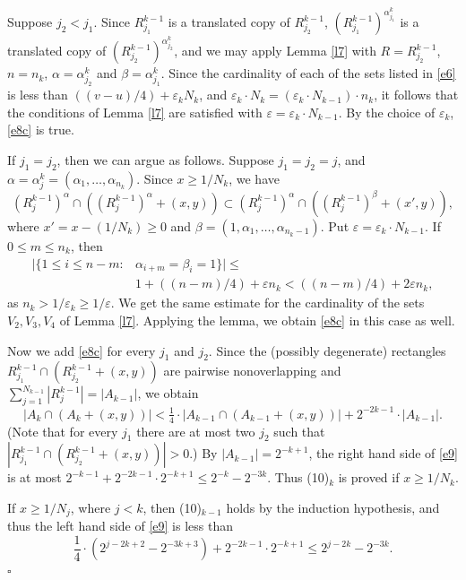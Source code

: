 \documentclass[12pt]{article}
\def\su{\subset}
\def\al{\alpha}
\def\be{\beta}
\def\ep{\varepsilon}
\def\cd{\cdot}
\def\stb{,\ldots ,}
\begin{document}
Suppose $j_2 < j_1$. Since $R_{j_1}^{k-1}$ is a translated copy of $R_{j_2}^{k-1}$,
$(R_{j_1}^{k-1} ) ^{\al^k_{j_1}}$ is a translated copy of $(R_{j_2}^{k-1} ) ^{\al^k_{j_2}}$,
and we may apply Lemma \ref{l7} with $R=R_{j_2}^{k-1}$, $n=n_k$, $\al =
\al^k_{j_2}$ and $\be = \al^k_{j_1}$. Since the cardinality of each of
the sets listed in \eqref{e6} is less than $((v-u)/4) +\ep_k N_k$, and
$\ep_k \cd N_k =(\ep _k\cd N_{k-1} ) \cd n_k$, it follows that the
conditions of Lemma \ref{l7} are satisfied with $\ep =\ep _k \cd N_{k-1}$.
By the choice of $\ep _k$, \eqref{e8c} is true.

If $j_1 =j_2$, then we can argue as follows. Suppose $j_1 =j_2 =j$, and
$\al =\al ^k_j =(\al _1 \stb \al _{n_k})$. Since $x\ge 1/N_k$, we have
$$ \left( R_j^{k-1}   \right) ^{\al} \cap \left( \left( R_j^{k-1}   \right) ^{\al}
+ (x,y) \right) \su \left( R_j^{k-1}   \right) ^{\al} \cap \left( \left( R_j^{k-1}
\right) ^\be  + (x',y) \right),$$
where $x'=x-(1/N_k)\ge 0$ and $\be =(1,\al _1 \stb \al_{n_k-1})$.
Put $\ep =\ep _k \cd N_{k-1}$. If $0\le m \le n_k$, then
\begin{align*}
| \{ 1\le i\le n-m \colon & \al _{i+m} =\be _i =1\}|  \le \\
&1 +((n-m)/4) +\ep n_k < ((n-m)/4) +2\ep n_k ,
\end{align*}
as $n_k>1/\ep _k\ge 1/\ep$. We get the same estimate for the cardinality
of the sets $V_2 , V_3 , V_4$ of Lemma \ref{l7}. Applying the lemma, we obtain
\eqref{e8c}  in this case as well.

Now we add \eqref{e8c} for every $j_1$ and $j_2$. Since the (possibly
degenerate) rectangles $R_{j_1}^{k-1} \cap (R_{j_2}^{k-1} +(x,y) )$
are pairwise nonoverlapping and $\sum_{j=1}^{N_{k-1}} |R^{k-1}_j |=|A_{k-1} |$,
we obtain
\begin{equation} \label{e9}
\left| A_k \cap \left( A_k + (x,y) \right)   \right| <
\tfrac{1}{4} \cd \left| A_{k-1} \cap \left( A_{k-1} + (x,y) \right)   \right|
+2^{-2k-1} \cd |A_{k-1} |. \tag{13}
\end{equation}
(Note that for every $j_1$ there are at most two $j_2$ such that
$|R_{j_1}^{k-1} \cap (R_{j_2}^{k-1} +(x,y) )|>0$.) By $|A_{k-1} |=2^{-k+1}$, the
right hand side of \eqref{e9} is at most $2^{-k-1} +2^{-2k-1} \cd 2^{-k+1} \le
2^{-k} -2^{-3k}$. Thus (10)$_k$ is proved if $x\ge 1/N_k$.

If $x\ge 1/N_j$, where $j<k$, then (10)$_{k-1}$ holds by
the induction hypothesis, and thus the left hand side of \eqref{e9} is less than
$$\frac{1}{4} \cd \left( 2^{j-2k+2} -2^{-3k+3} \right) +
2^{-2k-1} \cd 2^{-k+1} \le 2^{j-2k} -2^{-3k} .$$
 \hfill $\square$
\end{document}
